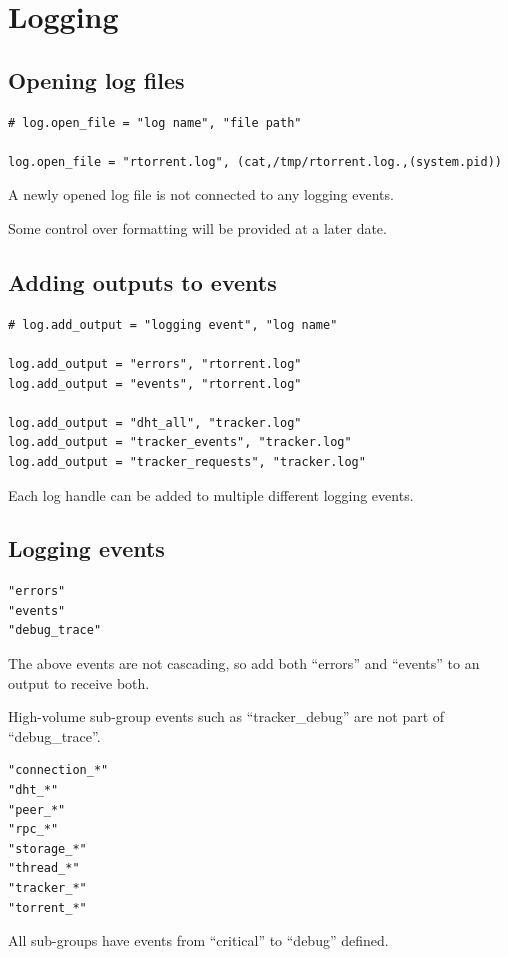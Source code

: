 \section{Logging}

\subsection{Opening log files}

\begin{verbatim}
# log.open_file = "log name", "file path"

log.open_file = "rtorrent.log", (cat,/tmp/rtorrent.log.,(system.pid))
\end{verbatim}

A newly opened log file is not connected to any logging events.

Some control over formatting will be provided at a later date.


\subsection{Adding outputs to events}

\begin{verbatim}
# log.add_output = "logging event", "log name"

log.add_output = "errors", "rtorrent.log"
log.add_output = "events", "rtorrent.log"

log.add_output = "dht_all", "tracker.log"
log.add_output = "tracker_events", "tracker.log"
log.add_output = "tracker_requests", "tracker.log"
\end{verbatim}

Each log handle can be added to multiple different logging events.


\subsection{Logging events}

\begin{verbatim}
"errors"
"events"
"debug_trace"
\end{verbatim}

The above events are not cascading, so add both ``errors'' and
``events'' to an output to receive both.

High-volume sub-group events such as ``tracker\_debug'' are not part
of ``debug\_trace''.

\begin{verbatim}
"connection_*"
"dht_*"
"peer_*"
"rpc_*"
"storage_*"
"thread_*"
"tracker_*"
"torrent_*"
\end{verbatim}

All sub-groups have events from ``critical'' to ``debug'' defined.

